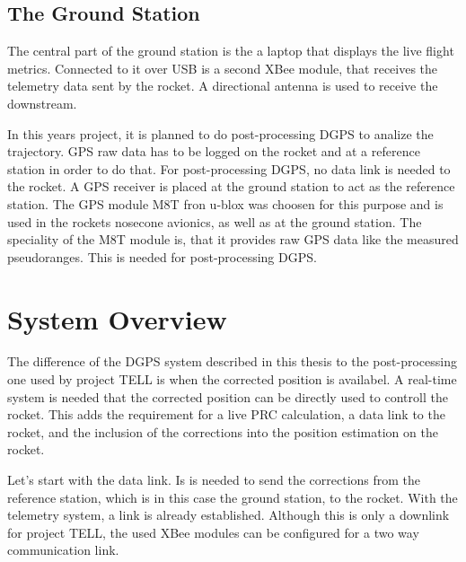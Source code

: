 \subsection{The Ground Station}

The central part of the ground station is the a laptop that displays the live flight metrics.
Connected to it over USB is a second XBee module, that receives the telemetry data sent by the rocket.
A directional antenna is used to receive the downstream.

In this years project, it is planned to do post-processing DGPS to analize the trajectory.
GPS raw data has to be logged on the rocket and at a reference station in order to do that.
For post-processing DGPS, no data link is needed to the rocket.
A GPS receiver is placed at the ground station to act as the reference station.
The GPS module M8T fron u-blox was choosen for this purpose and is used in the rockets nosecone avionics, as well as at the ground station.
The speciality of the M8T module is, that it provides raw GPS data like the measured pseudoranges.
This is needed for post-processing DGPS.

\section{System Overview}\label{sec:system_overview}

The difference of the DGPS system described in this thesis to the post-processing one used by project TELL is when the corrected position is availabel.
A real-time system is needed that the corrected position can be directly used to controll the rocket.
This adds the requirement for a live PRC calculation, a data link to the rocket, and the inclusion of the corrections into the position estimation on the rocket.

Let's start with the data link.
Is is needed to send the corrections from the reference station, which is in this case the ground station, to the rocket.
With the telemetry system, a link is already established.
Although this is only a downlink for project TELL, the used XBee modules can be configured for a two way communication link.

